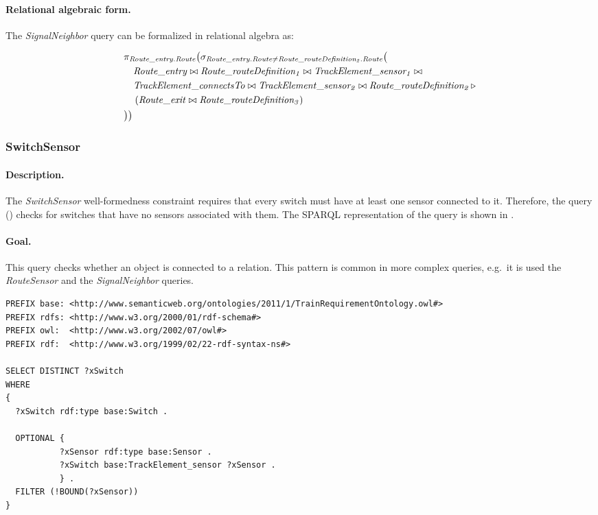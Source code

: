 
\paragraph{Relational algebraic form.} The \textit{SignalNeighbor} query can be formalized in relational algebra as:

\begin{align*}
& \pi_{\mathit{Route\_entry.Route}} \big( \sigma_{\mathit{Route\_entry.Route} \neq \mathit{Route\_routeDefinition_2.Route}} \big( \\
& \quad \mathit{Route\_entry} \bowtie \mathit{Route\_routeDefinition_1} \bowtie \mathit{TrackElement\_sensor_1} \bowtie \\
& \quad \mathit{TrackElement\_connectsTo} \bowtie \mathit{TrackElement\_sensor_2} \bowtie \mathit{Route\_routeDefinition_2} \, \triangleright \, \\
& \quad \left( \mathit{Route\_exit} \bowtie \mathit{Route\_routeDefinition_3} \right) \\
& \big) \big)
\end{align*}

\subsubsection{SwitchSensor}

\paragraph{Description.} The \textit{SwitchSensor} well-formedness constraint requires that every switch must have at least one sensor connected to it. Therefore, the query () checks for switches that have no sensors associated with them. The SPARQL representation of the query is shown in .

\paragraph{Goal.} This query checks whether an object is connected to a relation. This pattern is common in more complex queries, e.g.\ it is used the \textit{RouteSensor} and the \textit{SignalNeighbor} queries.

\begin{lstlisting}[caption=The RouteSensor query in SPARQL, label=lst:switchsensor-sparql]
PREFIX base: <http://www.semanticweb.org/ontologies/2011/1/TrainRequirementOntology.owl#>
PREFIX rdfs: <http://www.w3.org/2000/01/rdf-schema#>
PREFIX owl:  <http://www.w3.org/2002/07/owl#>
PREFIX rdf:  <http://www.w3.org/1999/02/22-rdf-syntax-ns#>

SELECT DISTINCT ?xSwitch
WHERE
{
  ?xSwitch rdf:type base:Switch .

  OPTIONAL { 
           ?xSensor rdf:type base:Sensor .
           ?xSwitch base:TrackElement_sensor ?xSensor .
           } .
  FILTER (!BOUND(?xSensor))
}
\end{lstlisting}

